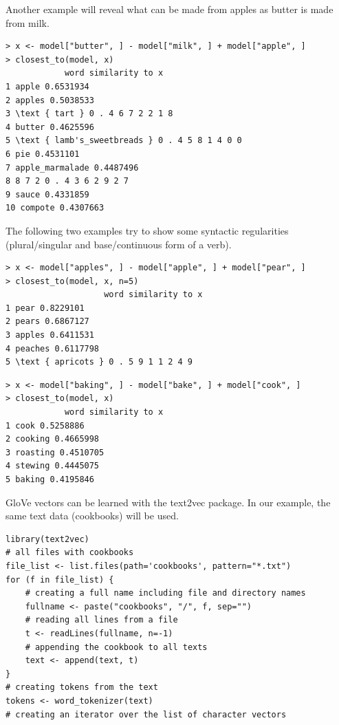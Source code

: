 Another example will reveal what can be made from apples as butter is made from milk.

\begin{verbatim}
> x <- model["butter", ] - model["milk", ] + model["apple", ]
> closest_to(model, x)
            word similarity to x
1 apple 0.6531934
2 apples 0.5038533
3 \text { tart } 0 . 4 6 7 2 2 1 8
4 butter 0.4625596
5 \text { lamb's_sweetbreads } 0 . 4 5 8 1 4 0 0
6 pie 0.4531101
7 apple_marmalade 0.4487496
8 8 7 2 0 . 4 3 6 2 9 2 7
9 sauce 0.4331859
10 compote 0.4307663
\end{verbatim}

The following two examples try to show some syntactic regularities (plural/singular and base/continuous form of a verb).

\begin{verbatim}
> x <- model["apples", ] - model["apple", ] + model["pear", ]
> closest_to(model, x, n=5)
                    word similarity to x
1 pear 0.8229101
2 pears 0.6867127
3 apples 0.6411531
4 peaches 0.6117798
5 \text { apricots } 0 . 5 9 1 1 2 4 9
\end{verbatim}

\begin{verbatim}
> x <- model["baking", ] - model["bake", ] + model["cook", ]
> closest_to(model, x)
            word similarity to x
1 cook 0.5258886
2 cooking 0.4665998
3 roasting 0.4510705
4 stewing 0.4445075
5 baking 0.4195846
\end{verbatim}

GloVe vectors can be learned with the text2vec package. In our example, the same text data (cookbooks) will be used.

\begin{verbatim}
library(text2vec)
# all files with cookbooks
file_list <- list.files(path='cookbooks', pattern="*.txt")
for (f in file_list) {
    # creating a full name including file and directory names
    fullname <- paste("cookbooks", "/", f, sep="")
    # reading all lines from a file
    t <- readLines(fullname, n=-1)
    # appending the cookbook to all texts
    text <- append(text, t)
}
# creating tokens from the text
tokens <- word_tokenizer(text)
# creating an iterator over the list of character vectors
\end{verbatim}

